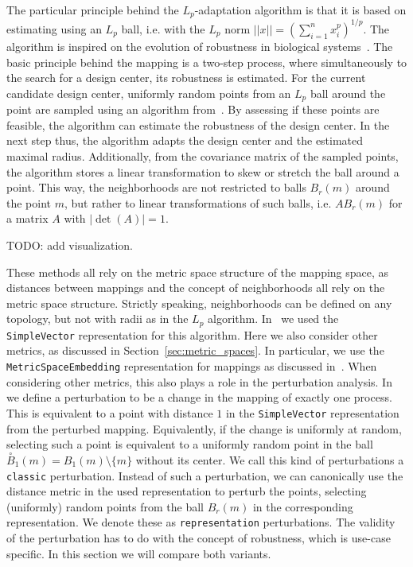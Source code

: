 The particular principle behind the $L_p$-adaptation algorithm is that it is based on estimating using an $L_p$ ball, i.e. with the $L_p$ norm $||x|| = (\sum_{i=1}^n x_i^p)^{1/p}$.
The algorithm is inspired on the evolution of robustness in biological systems~\cite{asmus2017lp}.
The basic principle behind the mapping is a two-step process, where simultaneously to the search for a design center, its robustness is estimated.
For the current candidate design center, uniformly random points from an $L_p$ ball around the point are sampled using an algorithm from~\cite{calafiore1998uniform}.
By assessing if these points are feasible, the algorithm can estimate the robustness of the design center.
In the next step thus, the algorithm adapts the design center and the estimated maximal radius.
Additionally, from the covariance matrix of the sampled points, the algorithm stores a linear transformation to skew or stretch the ball around a point.
This way, the neighborhoods are not restricted to balls $B_r(m)$ around the point $m$, but rather to linear transformations of such balls, i.e. $A B_r(m)$ for a matrix $A$ with $|\operatorname{det}(A)| = 1$.

TODO: add visualization.

These methods all rely on the metric space structure of the mapping space, as distances between mappings and the concept of neighborhoods all rely on the metric space structure.
Strictly speaking, neighborhoods can be defined on any topology, but not with radii as in the $L_p$ algorithm.
In~\cite{hempel_scopes17} we used the \texttt{SimpleVector} representation for this algorithm.
Here we also consider other metrics, as discussed in Section~\ref{sec:metric_spaces}.
In particular, we use the \texttt{MetricSpaceEmbedding} representation for mappings as discussed in~\cite{sec:representations}.
When considering other metrics, this also plays a role in the perturbation analysis.
In~\cite{hempel_scopes17} we define a perturbation to be a change in the mapping of exactly one process.
This is equivalent to a point with distance $1$ in the \texttt{SimpleVector} representation from the perturbed mapping.
Equivalently, if the change is uniformly at random, selecting such a point is equivalent to a uniformly random point in the ball $\overset{\circ}{B}_1(m) = B_1(m) \setminus \{ m \}$ without its center.
We call this kind of perturbations a \texttt{classic} perturbation.
Instead of such a perturbation, we can canonically use the distance metric in the used representation to perturb the points, selecting (uniformly) random points from the ball $B_r(m)$ in the corresponding representation.
We denote these as \texttt{representation} perturbations.
The validity of the perturbation has to do with the concept of robustness, which is use-case specific.
In this section we will compare both variants.

